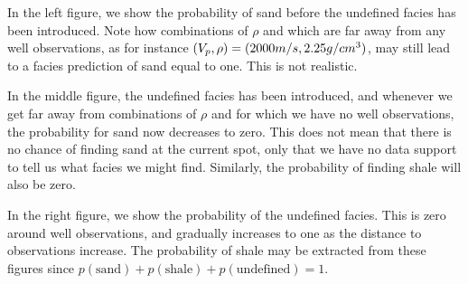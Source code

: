 In the left figure, we show the probability of sand before the
undefined facies has been introduced. Note how combinations of $\rho$
and \vp which are far away from any well observations, as for instance
$(V_p,\rho)=(2000m/s,2.25g/cm^3)$, may still lead to a facies
prediction of sand equal to one. This is not realistic.

In the middle figure, the undefined facies has been introduced, and
whenever we get far away from combinations of $\rho$ and \vp for which
we have no well observations, the probability for sand now decreases
to zero. This does not mean that there is no chance of finding sand at
the current spot, only that we have no data support to tell us what
facies we might find. Similarly, the probability of finding shale will
also be zero.

In the right figure, we show the probability of the undefined
facies. This is zero around well observations, and gradually increases
to one as the distance to observations increase. The probability of
shale may be extracted from these figures since
$p(\text{sand})+p(\text{shale})+p(\text{undefined})=1$.

